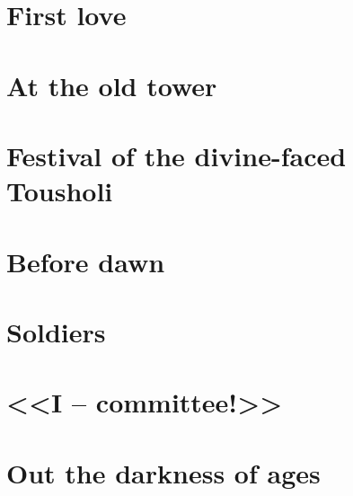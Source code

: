 \documentclass[smalldemyvopaper,11pt,twoside,onecolumn,openright,extrafontsizes]{memoir}
\begin{document}
\chapter{First love}
\chapter{At the old tower}
\chapter{Festival of the divine-faced Tousholi}
\chapter{Before dawn}
\chapter{Soldiers}
\chapter{<<I -- committee!>>}
\chapter{Out the darkness of ages}

\pagestyle{empty}
\cleardoublepage
\end{document}
